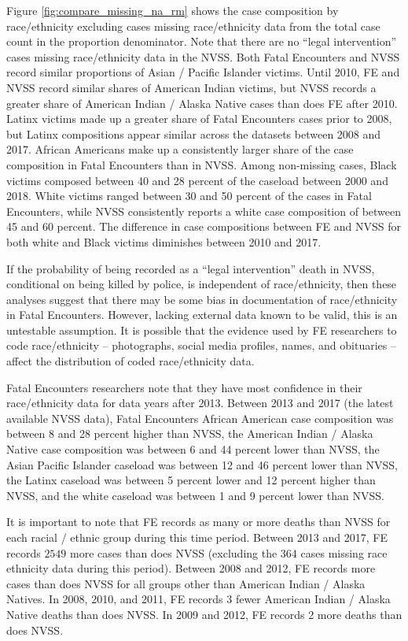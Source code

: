 \documentclass{article}
\begin{document}
Figure \ref{fig:compare_missing_na_rm} shows the case composition by race/ethnicity excluding cases missing race/ethnicity data from the total case count in the proportion denominator. Note that there are no ``legal intervention'' cases missing race/ethnicity data in the NVSS. Both Fatal Encounters and NVSS record similar proportions of Asian / Pacific Islander victims. Until 2010, FE and NVSS record similar shares of American Indian victims, but NVSS records a greater share of American Indian / Alaska Native cases than does FE after 2010. Latinx victims made up a greater share of Fatal Encounters cases prior to 2008, but Latinx compositions appear similar across the datasets between 2008 and 2017. African Americans make up a consistently larger share of the case composition in Fatal Encounters than in NVSS. Among non-missing cases, Black victims composed between 40 and 28 percent of the caseload between 2000 and 2018. White victims ranged between 30 and 50 percent of the cases in Fatal Encounters, while NVSS consistently reports a white case composition of between 45 and 60 percent. The difference in case compositions between FE and NVSS for both white and Black victims diminishes between 2010 and 2017.

If the probability of being recorded as a ``legal intervention'' death in NVSS, conditional on being killed by police, is independent of race/ethnicity, then these analyses suggest that there may be some bias in documentation of race/ethnicity in Fatal Encounters. However, lacking external data known to be valid, this is an untestable assumption. It is possible that the evidence used by FE researchers to code race/ethnicity -- photographs, social media profiles, names, and obituaries -- affect the distribution of coded race/ethnicity data. 

Fatal Encounters researchers note that they have most confidence in their race/ethnicity data for data years after 2013. Between 2013 and 2017 (the latest available NVSS data), Fatal Encounters African American case composition was between 8 and 28 percent higher than NVSS, the American Indian / Alaska Native case composition was between 6 and 44 percent lower than NVSS, the Asian Pacific Islander caseload was between 12 and 46 percent lower than NVSS, the Latinx caseload was between 5 percent lower and 12 percent higher than NVSS, and the white caseload was between 1 and 9 percent lower than NVSS. 

It is important to note that FE records as many or more deaths than NVSS for each racial / ethnic group during this time period. Between 2013 and 2017, FE records $2549$ more cases than does NVSS (excluding the $364$ cases missing race ethnicity data during this period). Between 2008 and 2012, FE records more cases than does NVSS for all groups other than American Indian / Alaska Natives. In 2008, 2010, and 2011, FE records 3 fewer American Indian / Alaska Native deaths than does NVSS. In 2009 and 2012, FE records 2 more deaths than does NVSS. 
\end{document}
